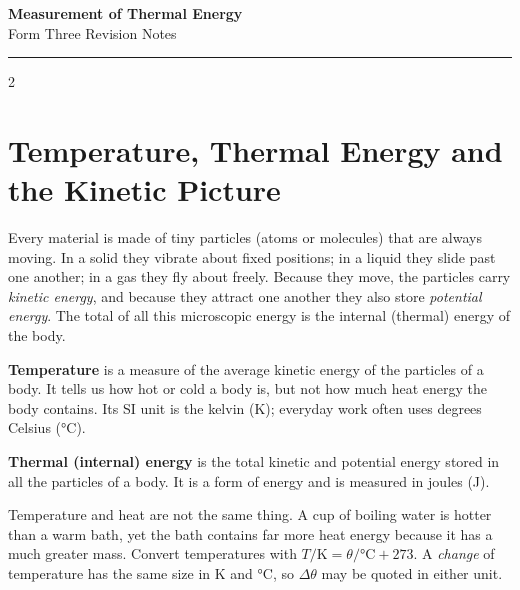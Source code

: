 \documentclass[10pt]{article}
\makeatletter
\let\theme@oldsection\section
\renewcommand{\section}{%
  \needspace{8\baselineskip}%
  \theme@oldsection}
\makeatother
\begin{document}
\begin{center}
  {\LARGE\bfseries Measurement of Thermal Energy}\\[2pt]
  {\large Form Three Revision Notes}\\[4pt]
  \rule{\linewidth}{0.8pt}
\end{center}

\vspace{4pt}

\begin{multicols}{2}

\section{Temperature, Thermal Energy and the Kinetic Picture}
Every material is made of tiny particles (atoms or molecules) that are
always moving. In a solid they vibrate about fixed positions; in a
liquid they slide past one another; in a gas they fly about freely.
Because they move, the particles carry \emph{kinetic energy}, and
because they attract one another they also store \emph{potential
energy}. The total of all this microscopic energy is the internal
(thermal) energy of the body.

\begin{definition}
\textbf{Temperature} is a measure of the average kinetic energy of the
particles of a body. It tells us how hot or cold a body is, but not how
much heat energy the body contains. Its SI unit is the kelvin
(\si{\kelvin}); everyday work often uses degrees Celsius
(\si{\degreeCelsius}).
\end{definition}

\begin{definition}
\textbf{Thermal (internal) energy} is the total kinetic and potential
energy stored in all the particles of a body. It is a form of energy
and is measured in joules (\si{\joule}).
\end{definition}

\begin{nb}
Temperature and heat are not the same thing. A cup of boiling water is
hotter than a warm bath, yet the bath contains far more heat energy
because it has a much greater mass. Convert temperatures with
$T/\si{\kelvin} = \theta/\si{\degreeCelsius} + 273$. A \emph{change} of
temperature has the same size in \si{\kelvin} and \si{\degreeCelsius},
so $\Delta\theta$ may be quoted in either unit.
\end{nb}


\end{multicols}
\end{document}
